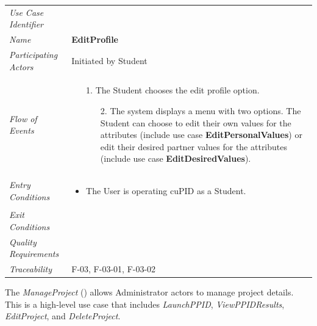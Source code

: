 \documentclass[12pt,letterpaper]{article}
\begin{document}
\begin{center}
	\begin{tabu} to 
		\toprule
		Use Case Identifier & \editprofile{} \\
		Name & {\bf EditProfile} \\
		Participating Actors & Initiated by Student \\
		Flow of Events & 
		\begin{minipage}[t]{\linewidth}
		    \begin{enumerate}
		    		\item[1.] The Student chooses the edit profile option.
		    		\begin{enumerate}
			    		\item[2.] The system displays a menu with two options. The Student can choose to edit their own values for the attributes (include use case \textbf{EditPersonalValues}) or edit their desired partner values for the attributes (include use case \textbf{EditDesiredValues}).
		    		\end{enumerate}
			\end{enumerate}
		\end{minipage} \\

		Entry Conditions &
		\begin{minipage}[t]{\linewidth}
			\begin{itemize}
			    \item The User is operating cuPID as a Student.
	        \end{itemize}
		\end{minipage} \\

		Exit Conditions & \\

		Quality Requirements & \\

		Traceability &  F-03, F-03-01, F-03-02 \\
		\toprule
	\end{tabu}
\end{center}

\vspace{1em}
The {\it ManageProject} ({\bf \manageproject{}}) allows Administrator actors to manage project details. This is a high-level use case that
includes {\it LaunchPPID}, {\it ViewPPIDResults}, {\it EditProject}, and {\it DeleteProject}.
\end{document}
